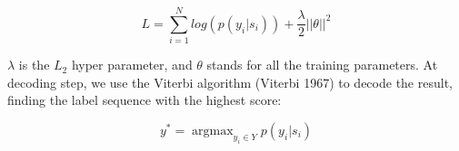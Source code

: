 \documentclass[letterpaper]{article} %
\begin{document}
\begin{equation}
L = \sum_{i=1}^{N}{log(p(y_i | s_i))} + \frac{\lambda}{2}{|| \theta ||}^2
\label{crf_probability}
\end{equation}

$\lambda$ is the $L_2$ hyper parameter, and $\theta$ stands for all the training parameters. At decoding step, we use the Viterbi algorithm (Viterbi 1967) to decode the result, finding the label sequence with the highest score: 

\begin{equation}
y^* = \mathop{\arg\max}_{y_i \in Y}{p(y_i | s_i)}
\label{crf_decode}
\end{equation}



\begin{table}[t]
\caption{Main Results on MSRA.}\smallskip
\centering
{}
\label{table_msra}
\end{table}

\begin{table}[t]
\caption{Main Results on Weibo NER.}\smallskip
\centering
{}
\label{table_weibo}
\end{table}
\end{document}
